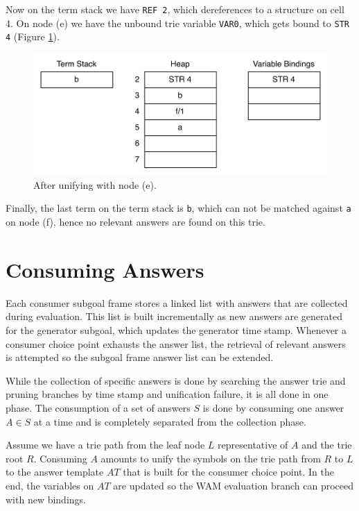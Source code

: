 Now on the term stack we have \texttt{REF 2}, which dereferences to
a structure on cell 4. On node (e) we have the unbound trie variable
\texttt{VAR0}, which gets bound to \texttt{STR 4} (Figure \ref{fig:collect_variable4}).

\begin{figure}[H]
  \centering
    \includegraphics[scale=0.6]{collect_variable4.pdf}
  \caption{After unifying with node (e).}
  \label{fig:collect_variable4}
\end{figure}

Finally, the last term on the term stack is \texttt{b}, which
can not be matched against \texttt{a} on node (f), hence no
relevant answers are found on this trie.

\section{Consuming Answers}

Each consumer subgoal frame stores a linked list with answers that are collected
during evaluation. This list is built incrementally as new answers are generated
for the generator subgoal, which updates the generator time stamp.
Whenever a consumer choice point exhausts the answer list, the retrieval
of relevant answers is attempted so the subgoal frame answer list can be extended.

While the collection of specific answers is done by searching the answer trie
and pruning branches by time stamp and unification failure, it is all done in one
phase. The consumption of a set of answers $S$ is done by consuming one answer $A \in S$
at a time and is completely separated from the collection phase.

Assume we have a trie path from the leaf node $L$ representative of $A$ and
the trie root $R$. Consuming $A$ amounts to unify the symbols on the trie path from $R$ to $L$
to the answer template $AT$ that is built for the consumer choice point. In the end, the variables
on $AT$ are updated so the WAM evaluation branch can proceed with new bindings.


